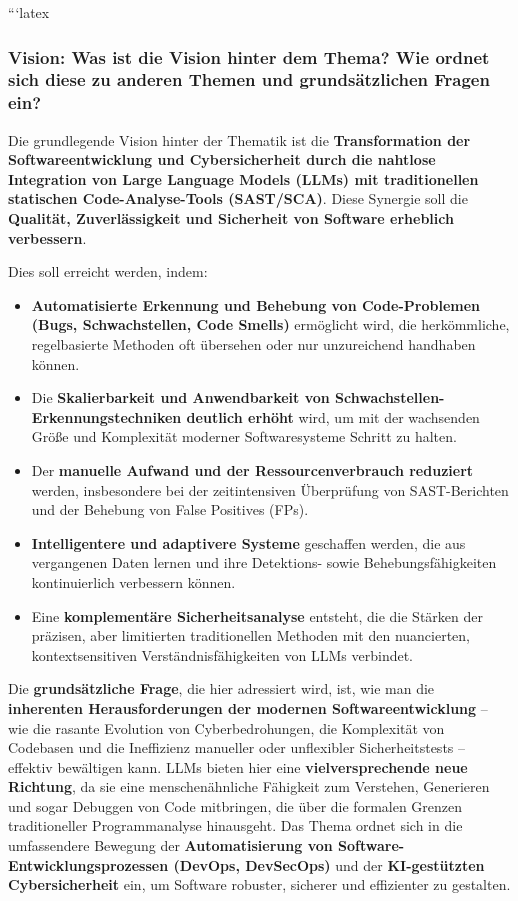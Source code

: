 ```latex
\subsubsection*{Vision: Was ist die Vision hinter dem Thema? Wie ordnet sich diese zu anderen Themen und grundsätzlichen Fragen ein?}

Die grundlegende Vision hinter der Thematik ist die \textbf{Transformation der Softwareentwicklung und Cybersicherheit durch die nahtlose Integration von Large Language Models (LLMs) mit traditionellen statischen Code-Analyse-Tools (SAST/SCA)}. Diese Synergie soll die \textbf{Qualität, Zuverlässigkeit und Sicherheit von Software erheblich verbessern}.

Dies soll erreicht werden, indem:
\begin{itemize}
    \item \textbf{Automatisierte Erkennung und Behebung von Code-Problemen (Bugs, Schwachstellen, Code Smells)} ermöglicht wird, die herkömmliche, regelbasierte Methoden oft übersehen oder nur unzureichend handhaben können.
    \item Die \textbf{Skalierbarkeit und Anwendbarkeit von Schwachstellen-Erkennungstechniken deutlich erhöht} wird, um mit der wachsenden Größe und Komplexität moderner Softwaresysteme Schritt zu halten.
    \item Der \textbf{manuelle Aufwand und der Ressourcenverbrauch reduziert} werden, insbesondere bei der zeitintensiven Überprüfung von SAST-Berichten und der Behebung von False Positives (FPs).
    \item \textbf{Intelligentere und adaptivere Systeme} geschaffen werden, die aus vergangenen Daten lernen und ihre Detektions- sowie Behebungsfähigkeiten kontinuierlich verbessern können.
    \item Eine \textbf{komplementäre Sicherheitsanalyse} entsteht, die die Stärken der präzisen, aber limitierten traditionellen Methoden mit den nuancierten, kontextsensitiven Verständnisfähigkeiten von LLMs verbindet.
\end{itemize}

Die \textbf{grundsätzliche Frage}, die hier adressiert wird, ist, wie man die \textbf{inherenten Herausforderungen der modernen Softwareentwicklung} – wie die rasante Evolution von Cyberbedrohungen, die Komplexität von Codebasen und die Ineffizienz manueller oder unflexibler Sicherheitstests – effektiv bewältigen kann. LLMs bieten hier eine \textbf{vielversprechende neue Richtung}, da sie eine menschenähnliche Fähigkeit zum Verstehen, Generieren und sogar Debuggen von Code mitbringen, die über die formalen Grenzen traditioneller Programmanalyse hinausgeht.
Das Thema ordnet sich in die umfassendere Bewegung der \textbf{Automatisierung von Software-Entwicklungsprozessen (DevOps, DevSecOps)} und der \textbf{KI-gestützten Cybersicherheit} ein, um Software robuster, sicherer und effizienter zu gestalten.

